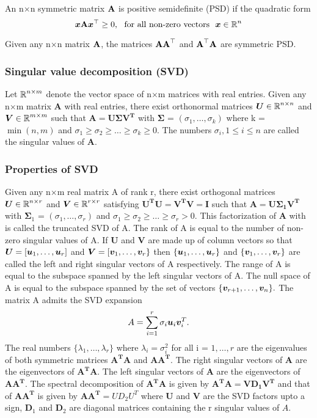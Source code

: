 An n$\times$n symmetric matrix $\textbf{A}$ is positive semidefinite (PSD) if the quadratic form
\[
\vect{x} \Bm{A} \vect{x}^{\top} \geq 0,\ \ \text{for all non-zero vectors} \ \ \vect{x} \in \R^{n}
\]

Given any n$\times$n matrix $\textbf{A}$, the matrices $\textbf{A}\textbf{A}^{\top}$
and $\textbf{A}^{\top}\textbf{A}$ are symmetric PSD.

\subsubsection{Singular value decomposition (SVD)}
Let $\operatorname{\mathbb{R}}^{n \times m}$ denote the vector space of n$\times$m matrices with real entries. Given any n$\times$m matrix $\bm{A}$ with real entries, there exist orthonormal matrices $\bm{U} \in \operatorname{\mathbb{R}}^{n \times n}$ and $\bm{V} \in \operatorname{\mathbb{R}}^{m \times m}$ such that 
$\bm{\displaystyle A = U \Sigma V^{T}}$ with $\bm{\Sigma}$ = $(\sigma_{1}, \ldots, \sigma_{k})$ where  k = $\min(n, m)$ and
 $\sigma_{1} \geq \sigma_{2} \geq \ldots \geq \sigma_{k} \geq 0$.
The numbers $\sigma_{i}, 1\leq i\leq n$ are called the singular values of $\bm{A}$. 


\subsubsection{Properties of SVD}
Given any n$\times$m real matrix A of rank r, there exist  orthogonal matrices 
$\bm{U} \in \operatorname{\mathbb{R}}^{n \times r}$ and $\bm{V} \in \operatorname{\mathbb{R}}^{r \times r}$ 
satisfying $\bm{U^{T}U = V^{T}V = I}$ such that $\bm{\text{A} = \text{U} \Sigma_{1} \text{V}^{T}}$ with $\bm{\Sigma}_{1}$ = $(\sigma_{1}, \ldots, \sigma_{r})$ and $\sigma_{1} \geq \sigma_{2} \geq \ldots \geq \sigma_{r} > 0$.
This factorization of $\bm{A}$ with  is called the truncated SVD of A.
The rank of A is equal to the number of non-zero singular values of A.
If $\bm{U}$ and $\bm{V}$ are made up of column vectors so that  $\bm{U} = [\boldsymbol{u}_1, \ldots, \boldsymbol{u}_{r}]$ and $\bm{V} = [\boldsymbol{v}_{1}, \ldots, \boldsymbol{v}_{r}\}$ then $\{ \boldsymbol{u}_1, \ldots, \boldsymbol{u}_{r} \}$  and $\{\boldsymbol{v}_{1}, \ldots, \boldsymbol{v}_{r} \}$ are called the left and right singular vectors of A respectively. The range of A is equal to the subspace spanned by the left singular vectors of A. The null space of A is equal to the subspace spanned by the set of vectors $\{\boldsymbol{v}_{r+1}, \ldots, \boldsymbol{v}_{n} \}.$
The matrix A admits the SVD expansion 
\[
A = \sum_{i=1}^{r} \sigma_{i} \boldsymbol{u}_{i} \boldsymbol{v}_{i}^{T}.
\]
The real numbers $\{\lambda_{1}, \ldots, \lambda_{r}\}$ where $\lambda_{i} = \sigma_{i}^{2}$ for all i = $1 , \ldots, r$ are the eigenvalues of both symmetric matrices $\bm{A^{T}A}$ and $\bm{AA^{T}}.$ The right singular vectors of $\bm{A}$ are the eigenvectors of $\bm{A^{T}A}.$ The left singular vectors of $\bm{A}$ are the eigenvectors of $\bm{AA^{T}}.$ The spectral decomposition of $\bm{A^{T}A}$ is given by $\bm{A^{T}A  = V D_{1} V^{T}}$ and that of  $\bm{AA^{T}}$ is given by  $\bm{AA^{T}} = U D_{2} U^{T}$ where $\bm{U}$ and $\bm{V}$ are the SVD factors upto a sign, $\bm{D}_{1}$ and $\bm{D}_{2}$ are diagonal matrices containing the r
singular values of $A$.


